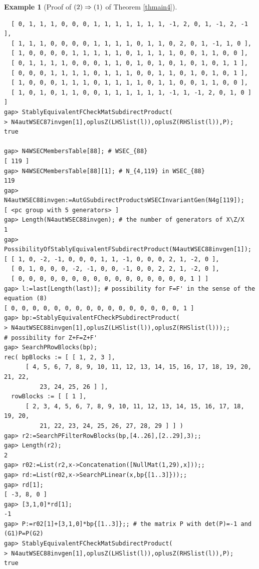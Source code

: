 \documentclass{amsart}
\theoremstyle{plain}
\theoremstyle{definition}
\newtheorem{example}[theorem]{Example}
\theoremstyle{remark}
\begin{document}
\begin{example}[Proof of ${\rm (2)}\Rightarrow {\rm (1)}$ of {Theorem \ref{thmain4}}]
\begin{verbatim}
  [ 0, 1, 1, 1, 0, 0, 0, 1, 1, 1, 1, 1, 1, 1, -1, 2, 0, 1, -1, 2, -1 ], 
  [ 1, 1, 1, 0, 0, 0, 0, 1, 1, 1, 1, 0, 1, 1, 0, 2, 0, 1, -1, 1, 0 ], 
  [ 1, 0, 0, 0, 0, 1, 1, 1, 1, 1, 0, 1, 1, 1, 1, 0, 0, 1, 1, 0, 0 ], 
  [ 0, 1, 1, 1, 1, 0, 0, 0, 1, 1, 0, 1, 0, 1, 0, 1, 0, 1, 0, 1, 1 ], 
  [ 0, 0, 0, 1, 1, 1, 1, 0, 1, 1, 1, 0, 0, 1, 1, 0, 1, 0, 1, 0, 1 ], 
  [ 1, 0, 0, 0, 1, 1, 1, 0, 1, 1, 1, 1, 0, 1, 1, 0, 0, 1, 1, 0, 0 ], 
  [ 1, 0, 1, 0, 1, 1, 0, 0, 1, 1, 1, 1, 1, 1, -1, 1, -1, 2, 0, 1, 0 ] ]
gap> StablyEquivalentFCheckMatSubdirectProduct(
> N4autWSEC87invgen[1],oplusZ(LHSlist(l)),oplusZ(RHSlist(l)),P);
true

gap> N4WSECMembersTable[88]; # WSEC_{88}
[ 119 ]
gap> N4WSECMembersTable[88][1]; # N_{4,119} in WSEC_{88}
119
gap> N4autWSEC88invgen:=AutGSubdirectProductsWSECInvariantGen(N4g[119]);
[ <pc group with 5 generators> ]
gap> Length(N4autWSEC88invgen); # the number of generators of X\Z/X
1
gap> PossibilityOfStablyEquivalentFSubdirectProduct(N4autWSEC88invgen[1]);
[ [ 1, 0, -2, -1, 0, 0, 0, 1, 1, -1, 0, 0, 0, 2, 1, -2, 0 ], 
  [ 0, 1, 0, 0, 0, -2, -1, 0, 0, -1, 0, 0, 2, 2, 1, -2, 0 ], 
  [ 0, 0, 0, 0, 0, 0, 0, 0, 0, 0, 0, 0, 0, 0, 0, 0, 1 ] ]
gap> l:=last[Length(last)]; # possibility for F=F' in the sense of the equation (8)
[ 0, 0, 0, 0, 0, 0, 0, 0, 0, 0, 0, 0, 0, 0, 0, 0, 1 ]
gap> bp:=StablyEquivalentFCheckPSubdirectProduct(
> N4autWSEC88invgen[1],oplusZ(LHSlist(l)),oplusZ(RHSlist(l)));;
# possibility for Z+F=Z+F'
gap> SearchPRowBlocks(bp);
rec( bpBlocks := [ [ 1, 2, 3 ], 
      [ 4, 5, 6, 7, 8, 9, 10, 11, 12, 13, 14, 15, 16, 17, 18, 19, 20, 21, 22, 
          23, 24, 25, 26 ] ], 
  rowBlocks := [ [ 1 ], 
      [ 2, 3, 4, 5, 6, 7, 8, 9, 10, 11, 12, 13, 14, 15, 16, 17, 18, 19, 20, 
          21, 22, 23, 24, 25, 26, 27, 28, 29 ] ] )
gap> r2:=SearchPFilterRowBlocks(bp,[4..26],[2..29],3);;
gap> Length(r2);
2
gap> r02:=List(r2,x->Concatenation([NullMat(1,29),x]));;
gap> rd:=List(r02,x->SearchPLinear(x,bp{[1..3]}));;
gap> rd[1];
[ -3, 8, 0 ]
gap> [3,1,0]*rd[1];
-1
gap> P:=r02[1]+[3,1,0]*bp{[1..3]};; # the matrix P with det(P)=-1 and (G1)P=P(G2)
gap> StablyEquivalentFCheckMatSubdirectProduct(
> N4autWSEC88invgen[1],oplusZ(LHSlist(l)),oplusZ(RHSlist(l)),P);
true


\end{verbatim}
\end{example}
\end{document}
